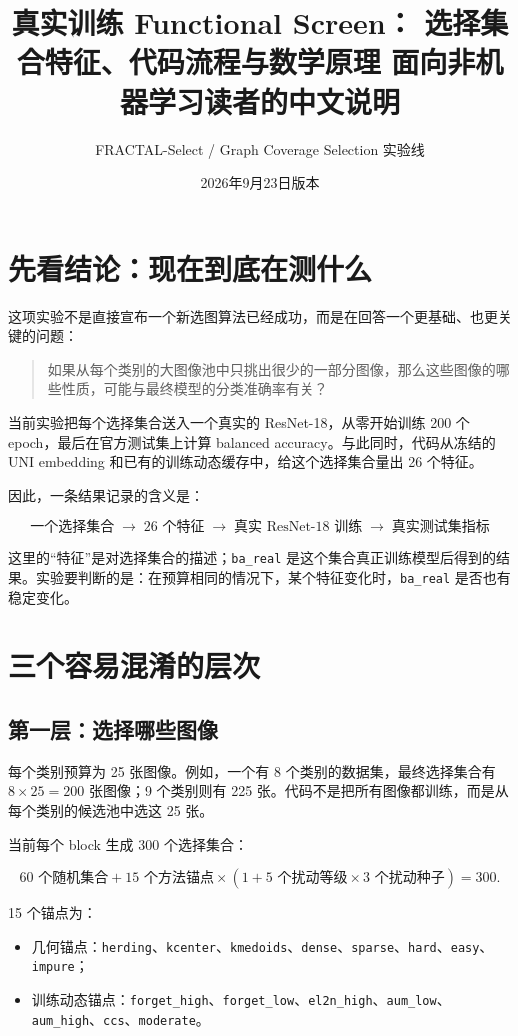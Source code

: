 \documentclass[UTF8,a4paper,12pt]{ctexart}
\title{真实训练 Functional Screen：\newline
选择集合特征、代码流程与数学原理\newline
\large 面向非机器学习读者的中文说明}
\author{FRACTAL-Select / Graph Coverage Selection 实验线}
\date{2026年9月23日版本}
\newcommand{\code}[1]{\texttt{#1}}
\begin{document}
\maketitle
\tableofcontents

\section{先看结论：现在到底在测什么}

这项实验不是直接宣布一个新选图算法已经成功，而是在回答一个更基础、也更关键的问题：

\begin{quote}
如果从每个类别的大图像池中只挑出很少的一部分图像，那么这些图像的哪些性质，可能与最终模型的分类准确率有关？
\end{quote}

当前实验把每个选择集合送入一个真实的 ResNet-18，从零开始训练 200 个 epoch，最后在官方测试集上计算 balanced accuracy。与此同时，代码从冻结的 UNI embedding 和已有的训练动态缓存中，给这个选择集合量出 26 个特征。

因此，一条结果记录的含义是：

\[
\boxed{
\text{一个选择集合}
\;\longrightarrow\;
\text{26 个特征}
\;\longrightarrow\;
\text{真实 ResNet-18 训练}
\;\longrightarrow\;
\text{真实测试集指标}
}
\]

这里的“特征”是对选择集合的描述；\code{ba\_real} 是这个集合真正训练模型后得到的结果。实验要判断的是：在预算相同的情况下，某个特征变化时，\code{ba\_real} 是否也有稳定变化。

\section{三个容易混淆的层次}

\subsection{第一层：选择哪些图像}

每个类别预算为 25 张图像。例如，一个有 8 个类别的数据集，最终选择集合有
\(8\times25=200\) 张图像；9 个类别则有 225 张。代码不是把所有图像都训练，而是从每个类别的候选池中选这 25 张。

当前每个 block 生成 300 个选择集合：

\[
60\text{ 个随机集合}
+15\text{ 个方法锚点}\times(1+5\text{ 个扰动等级}\times3\text{ 个扰动种子})
=300.
\]

15 个锚点为：

\begin{itemize}
  \item 几何锚点：\code{herding}、\code{kcenter}、\code{kmedoids}、\code{dense}、\code{sparse}、\code{hard}、\code{easy}、\code{impure}；
  \item 训练动态锚点：\code{forget\_high}、\code{forget\_low}、\code{el2n\_high}、\code{aum\_low}、\code{aum\_high}、\code{ccs}、\code{moderate}。
\end{itemize}
\end{document}
